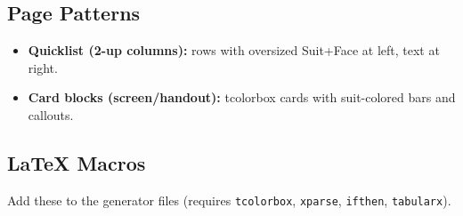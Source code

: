 \subsection*{Page Patterns}
\begin{itemize}
\item \textbf{Quicklist (2-up columns):} rows with oversized Suit+Face at left, text at right.
\item \textbf{Card blocks (screen/handout):} tcolorbox cards with suit-colored bars and callouts.
\end{itemize}

\subsection*{LaTeX Macros}
\noindent Add these to the generator files (requires \texttt{tcolorbox}, \texttt{xparse}, \texttt{ifthen}, \texttt{tabularx}).

